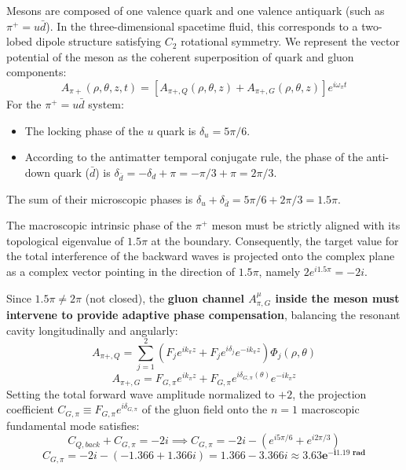 \documentclass[12pt, a4paper]{article}
\begin{document}
Mesons are composed of one valence quark and one valence antiquark (such as $\pi^+ = u\bar{d}$). In the three-dimensional spacetime fluid, this corresponds to a two-lobed dipole structure satisfying $C_2$ rotational symmetry. We represent the vector potential of the meson as the coherent superposition of quark and gluon components:
\begin{equation}
A_{\pi+}(\rho, \theta, z, t) = \left[ A_{\pi+, Q}(\rho, \theta, z) + A_{\pi+, G}(\rho, \theta, z) \right] e^{i\omega_\pi t} \label{eq:meson_ansatz}
\end{equation}
For the $\pi^+ = u\bar{d}$ system:
\begin{itemize}
    \item The locking phase of the $u$ quark is $\delta_u = 5\pi/6$.
    \item According to the antimatter temporal conjugate rule, the phase of the anti-down quark ($\bar{d}$) is $\delta_{\bar{d}} = -\delta_d + \pi = -\pi/3 + \pi = 2\pi/3$.
\end{itemize}
The sum of their microscopic phases is $\delta_u + \delta_{\bar{d}} = 5\pi/6 + 2\pi/3 = 1.5\pi$.

The macroscopic intrinsic phase of the $\pi^+$ meson must be strictly aligned with its topological eigenvalue of $1.5\pi$ at the boundary. Consequently, the target value for the total interference of the backward waves is projected onto the complex plane as a complex vector pointing in the direction of $1.5\pi$, namely $2 e^{i1.5\pi} = -2i$.

Since $1.5\pi \neq 2\pi$ (not closed), the \textbf{gluon channel $A^\mu_{\pi, G}$ inside the meson must intervene to provide adaptive phase compensation}, balancing the resonant cavity longitudinally and angularly:
\begin{equation}
A_{\pi+, Q} = \sum_{j=1}^2 \left( F_j e^{ik_\pi z} + F_j e^{i\delta_j} e^{-ik_\pi z} \right) \Phi_j(\rho, \theta) \label{eq:meson_quark_comp}
\end{equation}
\begin{equation}
A_{\pi+, G} = F_{G,\pi} e^{ik_\pi z} + F_{G,\pi} e^{i\delta_{G,\pi}(\theta)} e^{-ik_\pi z} \label{eq:meson_gluon_comp}
\end{equation}
Setting the total forward wave amplitude normalized to $+2$, the projection coefficient $C_{G, \pi} \equiv F_{G,\pi} e^{i\delta_{G,\pi}}$ of the gluon field onto the $n=1$ macroscopic fundamental mode satisfies:
\begin{equation}
C_{Q, back} + C_{G, \pi} = -2i \implies C_{G, \pi} = -2i - \left( e^{i5\pi/6} + e^{i2\pi/3} \right) \label{eq:meson_matching_eq}
\end{equation}
\begin{equation}
C_{G, \pi} = -2i - (-1.366 + 1.366i) = 1.366 - 3.366i \approx \mathbf{3.63 e^{-i 1.19 \text{ rad}}} \label{eq:meson_gluon_val}
\end{equation}
\end{document}
